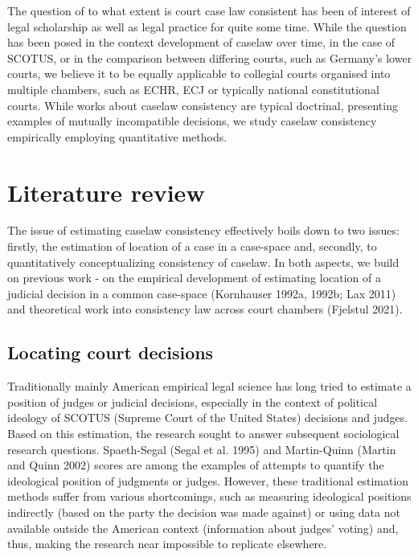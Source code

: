 \documentclass[
  11pt,
]{article}
\begin{document}
\setlength{\parindent}{16pt}
\setlength{\parskip}{0pt}

\doublespacing
The question of to what extent is court case law consistent has been of
interest of legal scholarship as well as legal practice for quite some
time. While the question has been posed in the context development of
caselaw over time, in the case of SCOTUS, or in the comparison between
differing courts, such as Germany's lower courts, we believe it to be
equally applicable to collegial courts organised into multiple chambers,
such as ECHR, ECJ or typically national constitutional courts. While
works about caselaw consistency are typical doctrinal, presenting
examples of mutually incompatible decisions, we study caselaw
consistency empirically employing quantitative methods.

\hypertarget{literature-review}{%
\section{Literature review}\label{literature-review}}

The issue of estimating caselaw consistency effectively boils down to
two issues: firstly, the estimation of location of a case in a
case-space and, secondly, to quantitatively conceptualizing consistency
of caselaw. In both aspects, we build on previous work - on the
empirical development of estimating location of a judicial decision in a
common case-space (Kornhauser 1992a, 1992b; Lax 2011) and theoretical
work into consistency law across court chambers (Fjelstul 2021).

\hypertarget{locating-court-decisions}{%
\subsection{Locating court decisions}\label{locating-court-decisions}}

Traditionally mainly American empirical legal science has long tried to
estimate a position of judges or judicial decisions, especially in the
context of political ideology of SCOTUS (Supreme Court of the United
States) decisions and judges. Based on this estimation, the research
sought to answer subsequent sociological research questions.
Spaeth-Segal (Segal et al. 1995) and Martin-Quinn (Martin and Quinn
2002) scores are among the examples of attempts to quantify the
ideological position of judgments or judges. However, these traditional
estimation methods suffer from various shortcomings, such as measuring
ideological positions indirectly (based on the party the decision was
made against) or using data not available outside the American context
(information about judges' voting) and, thus, making the research near
impossible to replicate elsewhere.
\end{document}
